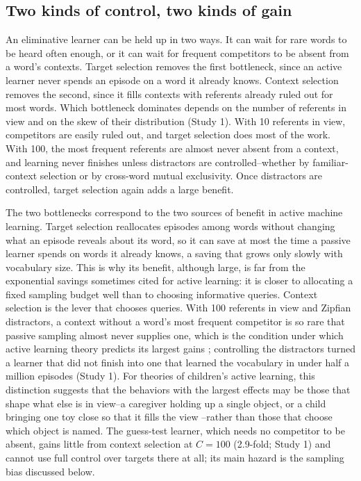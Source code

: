 \documentclass[a4paper,natbib,man]{apa6}
\begin{document}
\subsection{Two kinds of control, two kinds of gain}
An eliminative learner can be held up in two ways. It can wait for rare words to be heard often enough, or it can wait for frequent competitors to be absent from a word's contexts. Target selection removes the first bottleneck, since an active learner never spends an episode on a word it already knows. Context selection removes the second, since it fills contexts with referents already ruled out for most words. Which bottleneck dominates depends on the number of referents in view and on the skew of their distribution (Study 1). With 10 referents in view, competitors are easily ruled out, and target selection does most of the work. With 100, the most frequent referents are almost never absent from a context, and learning never finishes unless distractors are controlled--whether by familiar-context selection or by cross-word mutual exclusivity. Once distractors are controlled, target selection again adds a large benefit.

The two bottlenecks correspond to the two sources of benefit in active machine learning. Target selection reallocates episodes among words without changing what an episode reveals about its word, so it can save at most the time a passive learner spends on words it already knows, a saving that grows only slowly with vocabulary size. This is why its benefit, although large, is far from the exponential savings sometimes cited for active learning: it is closer to allocating a fixed sampling budget well than to choosing informative queries. Context selection is the lever that chooses queries. With 100 referents in view and Zipfian distractors, a context without a word's most frequent competitor is so rare that passive sampling almost never supplies one, which is the condition under which active learning theory predicts its largest gains \citep{Dasgupta:2005,Dasgupta:2011}; controlling the distractors turned a learner that did not finish into one that learned the vocabulary in under half a million episodes (Study 1). For theories of children's active learning, this distinction suggests that the behaviors with the largest effects may be those that shape what else is in view--a caregiver holding up a single object, or a child bringing one toy close so that it fills the view \citep{Yu:2009active,Suanda:2018}--rather than those that choose which object is named. The guess-test learner, which needs no competitor to be absent, gains little from context selection at $C=100$ (2.9-fold; Study 1) and cannot use full control over targets there at all; its main hazard is the sampling bias discussed below.
\end{document}

